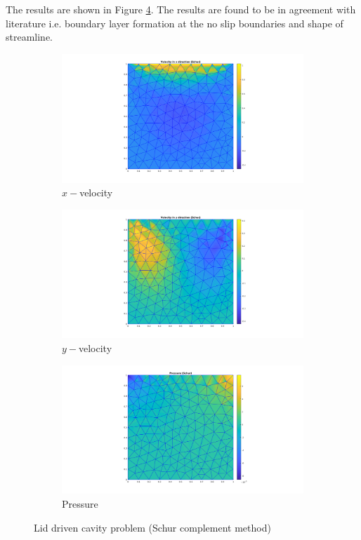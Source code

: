\documentclass[a4paper,oneside,openright,spanish,english]{book}
\begin{document}
The results are shown in Figure \ref{stoke_schur_lid}. The results are found to be in agreement with literature i.e. boundary layer formation at the no slip boundaries and shape of streamline. 

\begin{figure}
\begin{subfigure}{\textwidth}	
  \includegraphics[width=0.8\linewidth]{velocity_x_lid_driven_cavity.png}
  \caption{$x-$velocity} 
  \label{x_vel_stoke_schur_lid}
\end{subfigure}
\begin{subfigure}{\textwidth}	
  \includegraphics[width=0.8\linewidth]{velocity_y_lid_driven_cavity.png}
    \caption{$y-$velocity} 
    \label{y_vel_stoke_schur_lid}
\end{subfigure}
\begin{subfigure}{\textwidth}	
  \includegraphics[width=0.8\linewidth]{pressure_lid_driven_cavity.png}
    \caption{Pressure} 
    \label{pressure_stoke_schur_lid}
\end{subfigure}
\caption{Lid driven cavity problem (Schur complement method)}
\label{stoke_schur_lid}
\end{figure}
\end{document}
